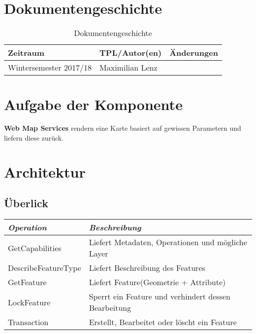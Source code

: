 \documentclass[12pt]{article}
\begin{document}
\section{Dokumentengeschichte}
\begin{table}[h]
 \begin{tabular}{|l|l|l|}
 \hline
 Zeitraum & TPL/Autor(en) & Änderungen \\
 \hline
 Wintersemester 2017/18 & Maximilian Lenz & 
  \\
 \hline
 \end{tabular}
 \caption{Dokumentengeschichte}
 \end{table}

\section{Aufgabe der Komponente}
\textbf{Web Map Services} rendern eine Karte basiert auf gewissen Parametern und liefern diese zur\"uck.
 

\section{Architektur}
\subsection{\"Uberlick}

\begin{tabular}{ll}
\emph{Operation} & \emph{Beschreibung} \\
\hline 
GetCapabilities & Liefert Metadaten, Operationen und m\"ogliche Layer \\ 
\hline 
DescribeFeatureType & Liefert Beschreibung des Features \\ 
\hline 
GetFeature & Liefert Feature(Geometrie + Attribute)\\ 
\hline 
LockFeature & Sperrt ein Feature und verhindert dessen Bearbeitung\\
\hline 
Transaction & Erstellt, Bearbeitet oder löscht ein Feature\\ 
\hline 
\end{tabular} 
\end{document}
